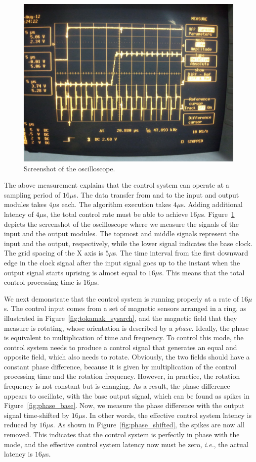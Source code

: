 \begin{figure}[t]
 \centering
 \includegraphics[width=0.85\hsize]{eps/oscilloscope.eps}
 \caption{Screenshot of the oscilloscope.}
 \label{fig:oscilloscope}
\end{figure}

The above measurement explains that the control system can operate at a
sampling period of $16\mu$s.
The data transfer from and to the input and output modules takes $4\mu$s
each.
The algorithm execution takes $4\mu$s.
Adding additional latency of $4\mu$s, the total control rate must be
able to achieve $16\mu$s.
Figure~\ref{fig:oscilloscope} depicts the screenshot of the oscilloscope
where we measure the signals of the input and the output modules.
The topmost and middle signals represent the input and the output,
respectively, while the lower signal indicates the base clock.
The grid spacing of the X axis is $5\mu$s.
The time interval from the first downward edge in the clock signal after
the input signal goes up to the instant when the output signal starts
uprising is almost equal to $16\mu$s.
This means that the total control processing time is $16\mu$s. 

We next demonstrate that the control system is running properly at a
rate of $16\mu$s.
The control input comes from a set of magnetic sensors arranged in a
ring, as illustrated in Figure~\ref{fig:tokamak_sysarch}, and the
magnetic field that they measure is rotating, whose orientation is
described by a \textit{phase}.
Ideally, the phase is equivalent to multiplication of time and
frequency.
To control this mode, the control system needs to produce a control
signal that generates an equal and opposite field, which also needs to
rotate.
Obviously, the two fields should have a constant phase difference,
because it is given by multiplication of the control processing time and
the rotation frequency.
However, in practice, the rotation frequency is not constant but is
changing.
As a result, the phase difference appears to oscillate, with the base
output signal, which can be found as spikes in
Figure~\ref{fig:phase_base}.
Now, we measure the phase difference with the output signal time-shifted
by $16\mu$s.
In other words, the effective control system latency is reduced by
$16\mu$s.
As shown in Figure~\ref{fig:phase_shifted}, the spikes are now all
removed.
This indicates that the control system is perfectly in phase with the
mode, and the effective control system latency now must be zero,
\textit{i.e.}, the actual latency is $16\mu$s.

